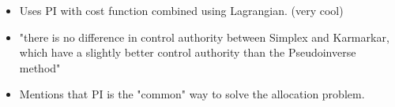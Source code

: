 \begin{itemize}
        \item \cite{Yang2011OptimalMethod} Uses PI with cost function combined using Lagrangian. (very cool)

        \item \cite{DevelopmentManoeuvres} "there is no difference in control authority between Simplex and Karmarkar, which have a slightly
        better control authority than the Pseudoinverse method"

        \item \cite{Johansen2013ControlSurvey} Mentions that PI is the "common" way to solve the allocation problem.
\end{itemize}